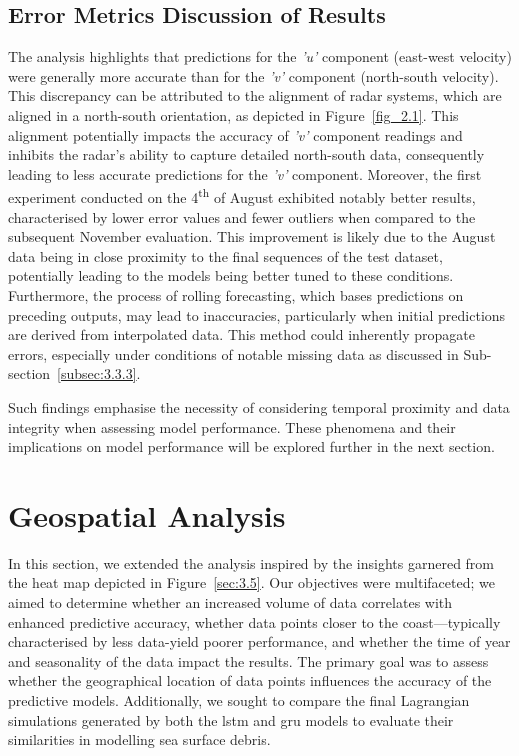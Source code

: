 \subsection{Error Metrics Discussion of Results}
\label{subsec:4.1.2}

The analysis highlights that predictions for the \textit{'u'} component (east-west velocity) were generally more accurate than for the \textit{'v'} component (north-south velocity). This discrepancy can be attributed to the alignment of radar systems, which are aligned in a north-south orientation, as depicted in Figure~\ref{fig_2.1}. This alignment potentially impacts the accuracy of \textit{'v'} component readings and inhibits the radar's ability to capture detailed north-south data, consequently leading to less accurate predictions for the \textit{'v'} component. Moreover, the first experiment conducted on the 4\textsuperscript{th} of August exhibited notably better results, characterised by lower error values and fewer outliers when compared to the subsequent November evaluation. This improvement is likely due to the August data being in close proximity to the final sequences of the test dataset, potentially leading to the models being better tuned to these conditions. Furthermore, the process of rolling forecasting, which bases predictions on preceding outputs, may lead to inaccuracies, particularly when initial predictions are derived from interpolated data. This method could inherently propagate errors, especially under conditions of notable missing data as discussed in Sub-section~\ref{subsec:3.3.3}.

Such findings emphasise the necessity of considering temporal proximity and data integrity when assessing model performance. These phenomena and their implications on model performance will be explored further in the next section.

\section{Geospatial Analysis}
\label{sec:4.2}

In this section, we extended the analysis inspired by the insights garnered from the heat map depicted in Figure~\ref{sec:3.5}. Our objectives were multifaceted; we aimed to determine whether an increased volume of data correlates with enhanced predictive accuracy, whether data points closer to the coast—typically characterised by less data-yield poorer performance, and whether the time of year and seasonality of the data impact the results. The primary goal was to assess whether the geographical location of data points influences the accuracy of the predictive models. Additionally, we sought to compare the final Lagrangian simulations generated by both the \acrshort{lstm} and \acrshort{gru} models to evaluate their similarities in modelling sea surface debris.

